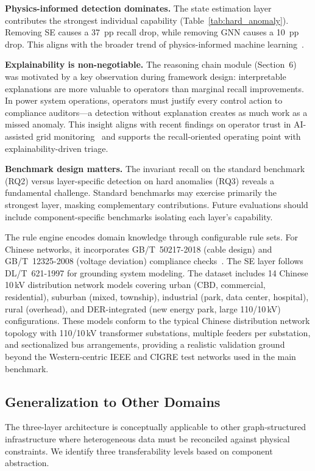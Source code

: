 \documentclass[research]{fcs}
\begin{document}
\textbf{Physics-informed detection dominates.} The state estimation layer contributes the strongest individual capability (Table~\ref{tab:hard_anomaly}). Removing SE causes a 37~pp recall drop, while removing GNN causes a 10~pp drop. This aligns with the broader trend of physics-informed machine learning~\cite{physics_informed_gnn_se2023}.

\textbf{Explainability is non-negotiable.} The reasoning chain module (Section~6) was motivated by a key observation during framework design: interpretable explanations are more valuable to operators than marginal recall improvements. In power system operations, operators must justify every control action to compliance auditors---a detection without explanation creates as much work as a missed anomaly. This insight aligns with recent findings on operator trust in AI-assisted grid monitoring~\cite{xai_cps2026} and supports the recall-oriented operating point with explainability-driven triage.

\textbf{Benchmark design matters.} The invariant recall on the standard benchmark (RQ2) versus layer-specific detection on hard anomalies (RQ3) reveals a fundamental challenge. Standard benchmarks may exercise primarily the strongest layer, masking complementary contributions. Future evaluations should include component-specific benchmarks isolating each layer's capability.

The rule engine encodes domain knowledge through configurable rule sets. For Chinese networks, it incorporates GB/T~50217-2018 (cable design) and GB/T~12325-2008 (voltage deviation) compliance checks~\cite{gb50217,gb12325}. The SE layer follows DL/T~621-1997 for grounding system modeling. The dataset includes 14 Chinese 10\,kV distribution network models covering urban (CBD, commercial, residential), suburban (mixed, township), industrial (park, data center, hospital), rural (overhead), and DER-integrated (new energy park, large 110/10\,kV) configurations. These models conform to the typical Chinese distribution network topology with 110/10\,kV transformer substations, multiple feeders per substation, and sectionalized bus arrangements, providing a realistic validation ground beyond the Western-centric IEEE and CIGRE test networks used in the main benchmark.

\subsection{Generalization to Other Domains}

The three-layer architecture is conceptually applicable to other graph-structured infrastructure where heterogeneous data must be reconciled against physical constraints. We identify three transferability levels based on component abstraction.
\end{document}
